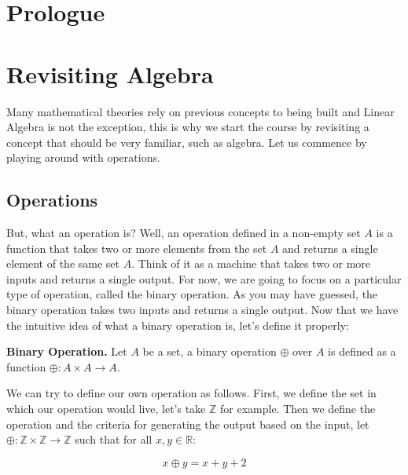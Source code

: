 \documentclass{report}
\begin{document}

    \chapter*{Prologue}

    \tableofcontents

    \pagebreak
    \chapter{Revisiting Algebra}

    Many mathematical theories rely on previous concepts to being built and Linear Algebra is not the exception, this is why we start the course by revisiting a concept that should be very familiar, such as algebra. Let us commence by playing around with operations.

    \section{Operations}

    But, what an operation is? Well, an operation defined in a non-empty set $A$ is a function that takes two or more elements from the set $A$ and returns a single element of the same set $A$. Think of it as a machine that takes two or more inputs and returns a single output. For now, we are going to focus on a particular type of operation, called the binary operation. As you may have guessed, the binary operation takes two inputs and returns a single output. Now that we have the intuitive idea of what a binary operation is, let's define it properly:\\

    \begin{defBox}
        \textbf{Binary Operation.} Let $A$ be a set, a binary operation $\oplus$ over $A$ is defined as a function $\oplus: A\times A \rightarrow A$.
    \end{defBox}

    We can try to define our own operation as follows. First, we define the set in which our operation would live, let's take $\mathbb{Z}$ for example. Then we define the operation and the criteria for generating the output based on the input, let $\oplus: \mathbb{Z} \times \mathbb{Z} \rightarrow \mathbb{Z}$ such that for all $x, y \in \mathbb{R}$:

    $$x \oplus y = x + y + 2$$
\end{document}
